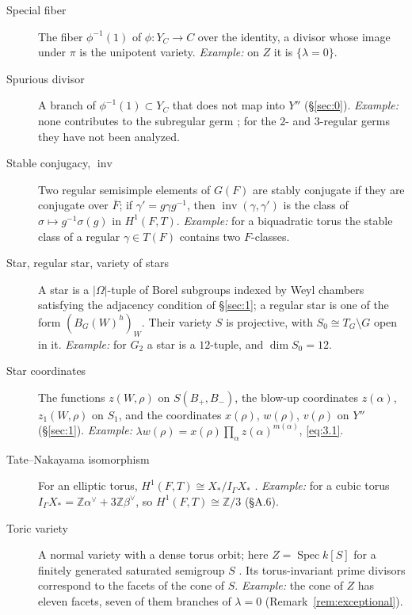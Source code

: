 \documentclass[12pt,letterpaper]{amsart}
\theoremstyle{plain}
\theoremstyle{definition}
\theoremstyle{remark}
\theoremstyle{definition}
\newcommand{\ovF}{\overline{F}}
\newcommand{\zzz}{\mathbb{Z}}
\DeclareMathOperator{\inv}{inv}
\begin{document}
\begin{description}
\item[Special fiber] The fiber $\phi^{-1}(1)$ of $\phi:Y_C\to C$ over the
identity, a divisor whose image under $\pi$ is the unipotent variety.
\emph{Example:} on $Z$ it is $\{\lambda=0\}$.

\item[Spurious divisor] A branch of $\phi^{-1}(1)\subset Y_C$ that does not
map into $Y''$ (\S\ref{sec:0}). \emph{Example:} none contributes to the
subregular germ \cite[Ch.~III]{Ha92a}; for the $2$- and $3$-regular germs they
have not been analyzed.

\item[Stable conjugacy, $\inv$] Two regular semisimple elements of $G(F)$ are
stably conjugate if they are conjugate over $\ovF$; if $\gamma'=g\gamma g^{-1}$,
then $\inv(\gamma,\gamma')$ is the class of $\sigma\mapsto g^{-1}\sigma(g)$ in
$H^1(F,T)$. \emph{Example:} for a biquadratic torus the stable class of a
regular $\gamma\in T(F)$ contains two $F$-classes.

\item[Star, regular star, variety of stars] A star is a $|\Omega|$-tuple of
Borel subgroups indexed by Weyl chambers satisfying the adjacency condition of
\S\ref{sec:1}; a regular star is one of the form $(B_G(W)^h)_W$. Their variety
$S$ is projective, with $S_0\cong T_G\setminus G$ open in it.
\emph{Example:} for $G_2$ a star is a $12$-tuple, and $\dim S_0=12$.

\item[Star coordinates] The functions $z(W,\rho)$ on $S(B_+,B_-)$, the
blow-up coordinates $z(\alpha)$, $z_1(W,\rho)$ on $S_1$, and the coordinates
$x(\rho)$, $w(\rho)$, $v(\rho)$ on $Y''$ (\S\ref{sec:1}). \emph{Example:}
$\lambda w(\rho)=x(\rho)\prod_\alpha z(\alpha)^{m(\alpha)}$, \eqref{eq:3.1}.

\item[Tate--Nakayama isomorphism] For an elliptic torus,
$H^1(F,T)\cong X_*/I_\Gamma X_*$ \cite{La79}. \emph{Example:} for a cubic torus
$I_\Gamma X_*=\zzz\alpha^\vee+3\zzz\beta^\vee$, so $H^1(F,T)\cong\zzz/3$
(\S A.6).

\item[Toric variety] A normal variety with a dense torus orbit; here
$Z=\operatorname{Spec}k[S]$ for a finitely generated saturated semigroup $S$
\cite{Ke72}. Its torus-invariant prime divisors correspond to the facets of the
cone of $S$. \emph{Example:} the cone of $Z$ has eleven facets, seven of them
branches of $\lambda=0$ (Remark~\ref{rem:exceptional}).


\end{description}
\end{document}
